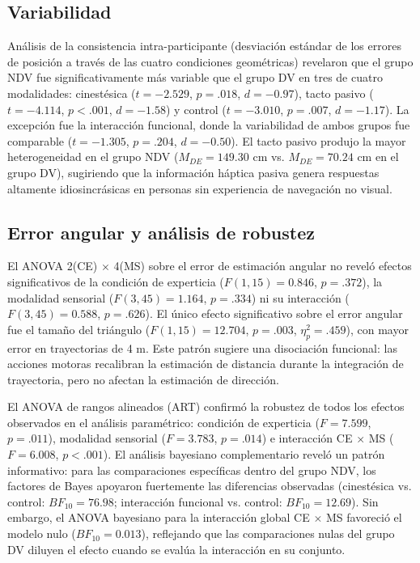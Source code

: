 \documentclass[12pt,letterpaper]{article}
\begin{document}
\subsection{Variabilidad}

Análisis de la consistencia intra-participante (desviación estándar de los errores de posición a través de las cuatro condiciones geométricas) revelaron que el grupo NDV fue significativamente más variable que el grupo DV en tres de cuatro modalidades: cinestésica ($t = -2.529$, $p = .018$, $d = -0.97$), tacto pasivo ($t = -4.114$, $p < .001$, $d = -1.58$) y control ($t = -3.010$, $p = .007$, $d = -1.17$). La excepción fue la interacción funcional, donde la variabilidad de ambos grupos fue comparable ($t = -1.305$, $p = .204$, $d = -0.50$). El tacto pasivo produjo la mayor heterogeneidad en el grupo NDV ($M_{DE} = 149.30$ cm vs. $M_{DE} = 70.24$ cm en el grupo DV), sugiriendo que la información háptica pasiva genera respuestas altamente idiosincrásicas en personas sin experiencia de navegación no visual.

\subsection{Error angular y análisis de robustez}

El ANOVA 2(CE) $\times$ 4(MS) sobre el error de estimación angular no reveló efectos significativos de la condición de experticia ($F(1, 15) = 0.846$, $p = .372$), la modalidad sensorial ($F(3, 45) = 1.164$, $p = .334$) ni su interacción ($F(3, 45) = 0.588$, $p = .626$). El único efecto significativo sobre el error angular fue el tamaño del triángulo ($F(1, 15) = 12.704$, $p = .003$, $\eta^2_p = .459$), con mayor error en trayectorias de 4 m. Este patrón sugiere una disociación funcional: las acciones motoras recalibran la estimación de distancia durante la integración de trayectoria, pero no afectan la estimación de dirección.

El ANOVA de rangos alineados (ART) confirmó la robustez de todos los efectos observados en el análisis paramétrico: condición de experticia ($F = 7.599$, $p = .011$), modalidad sensorial ($F = 3.783$, $p = .014$) e interacción CE $\times$ MS ($F = 6.008$, $p < .001$). El análisis bayesiano complementario reveló un patrón informativo: para las comparaciones específicas dentro del grupo NDV, los factores de Bayes apoyaron fuertemente las diferencias observadas (cinestésica vs. control: $BF_{10} = 76.98$; interacción funcional vs. control: $BF_{10} = 12.69$). Sin embargo, el ANOVA bayesiano para la interacción global CE $\times$ MS favoreció el modelo nulo ($BF_{10} = 0.013$), reflejando que las comparaciones nulas del grupo DV diluyen el efecto cuando se evalúa la interacción en su conjunto.
\end{document}
